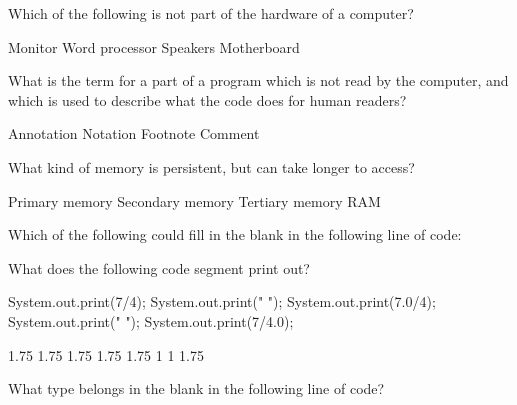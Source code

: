 \documentclass[answers,addpoints]{exam} %
\begin{document}
\begin{questions}

\question[2] Which of the following is not part of the hardware of a computer?
\begin{choices}
    \choice Monitor
    \CorrectChoice Word processor
    \choice Speakers
    \choice Motherboard
\end{choices}

\question[2] What is the term for a part of a program which is not read by the computer, and which is used to describe what the code does for human readers?
\begin{choices}
    \choice Annotation
    \choice Notation
    \choice Footnote
    \CorrectChoice Comment
\end{choices}

\question[2] What kind of memory is persistent, but can take longer to access?
\begin{choices}
    \choice Primary memory
    \CorrectChoice Secondary memory
    \choice Tertiary memory
    \choice RAM
\end{choices}

\question[2] Which of the following could fill in the blank in the following line of code:
    \begin{center}
    \end{center}
\begin{choices}
    \choice {}
    \choice {}
    \CorrectChoice {}
    \choice {}
\end{choices}

\question[2] What does the following code segment print out?
\begin{code}
    System.out.print(7/4);
    System.out.print(" ");
    System.out.print(7.0/4);
    System.out.print(" ");
    System.out.print(7/4.0);
\end{code}
\begin{choices}
     1.75 1.75
     1.75 1.75
     1.75 1
     1 1.75
\end{choices}

\question[2] What type belongs in the blank in the following line of code?
\begin{center}
\end{center}
\begin{choices}
    \choice {}
    \choice {}
    \choice {}
    \CorrectChoice {}
\end{choices}


\end{questions}
\end{document}
